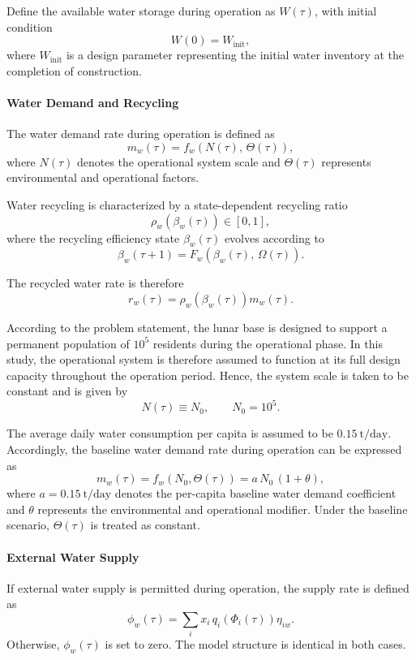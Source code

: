 \documentclass[12pt]{article}
\begin{document}
Define the available water storage during operation as $W(\tau)$, with initial condition
\[
W(0)=W_{\mathrm{init}},
\]
where $W_{\mathrm{init}}$ is a design parameter representing the initial water inventory at the completion of construction.

\paragraph{Water Demand and Recycling}

The water demand rate during operation is defined as
\[
m_w(\tau)=f_w\!\left(N(\tau),\,\Theta(\tau)\right),
\]
where $N(\tau)$ denotes the operational system scale and $\Theta(\tau)$ represents environmental and operational factors.

Water recycling is characterized by a state-dependent recycling ratio
\[
\rho_w\!\left(\beta_w(\tau)\right)\in[0,1],
\]
where the recycling efficiency state $\beta_w(\tau)$ evolves according to
\[
\beta_w(\tau+1)=F_w\!\left(\beta_w(\tau),\,\Omega(\tau)\right).
\]

The recycled water rate is therefore
\[
r_w(\tau)=\rho_w\!\left(\beta_w(\tau)\right)m_w(\tau).
\]

According to the problem statement, the lunar base is designed to support a permanent population of $10^5$ residents during the operational phase. In this study, the operational system is therefore assumed to function at its full design capacity throughout the operation period. Hence, the system scale is taken to be constant and is given by
\[
N(\tau)\equiv N_0,\qquad N_0=10^5.
\]

The average daily water consumption per capita is assumed to be $0.15~\mathrm{t/day}$. Accordingly, the baseline water demand rate during operation can be expressed as
\[
m_w(\tau)=f_w\!\left(N_0,\Theta(\tau)\right)
= a\,N_0\,(1+\theta),
\]
where $a=0.15~\mathrm{t/day}$ denotes the per-capita baseline water demand coefficient and $\theta$ represents the environmental and operational modifier. Under the baseline scenario, $\Theta(\tau)$ is treated as constant.


\paragraph{External Water Supply}

If external water supply is permitted during operation, the supply rate is defined as
\[
\phi_w(\tau)=\sum_i x_i\,q_i\!\left(\Phi_i(\tau)\right)\eta_{iw}.
\]
Otherwise, $\phi_w(\tau)$ is set to zero. The model structure is identical in both cases.
\end{document}
